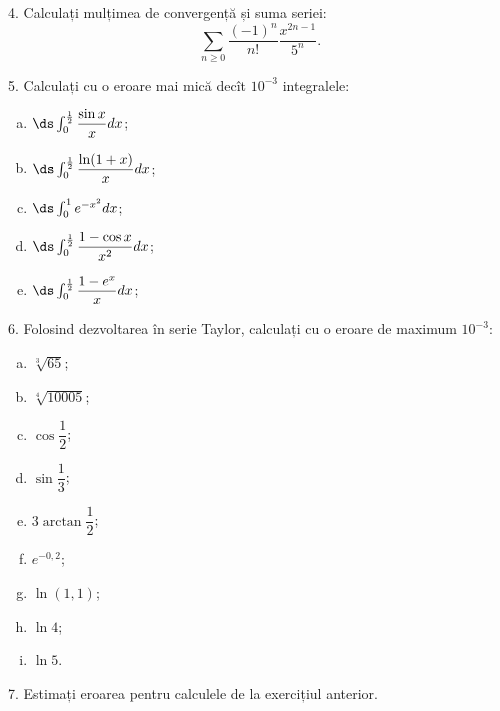 \vspace{0.5cm}

4. Calculați mulțimea de convergență și suma seriei:
\[
    \sum_{n \geq 0} \dfrac{(-1)^n}{n!} \dfrac{x^{2n - 1}}{5^n}.
\]

\vspace{0.5cm}

5. Calculați cu o eroare mai mică decît $ 10^{-3} $ integralele:
\begin{enumerate}[(a)]
    \item $ \ds\int_0^{\frac{1}{2}} \dfrac{\sin x}{x} dx $;
    \item $ \ds\int_0^{\frac{1}{2}} \dfrac{\ln(1 + x)}{x} dx $;
    \item $ \ds\int_0^1 e^{-x^2} dx $;
    \item $ \ds\int_0^{\frac{1}{2}} \dfrac{1 - \cos x}{x^2} dx $;
    \item $ \ds\int_0^{\frac{1}{2}} \dfrac{1 - e^x}{x} dx $;
\end{enumerate}

\vspace{0.5cm}

6. Folosind dezvoltarea în serie Taylor, calculați cu o eroare
de maximum $ 10^{-3} $:
\begin{enumerate}[(a)]
    \item $ \sqrt[3]{65} $;
    \item $ \sqrt[4]{10005} $;
    \item $ \cos \dfrac{1}{2} $;
    \item $ \sin \dfrac{1}{3} $;
    \item $ 3 \arctan \dfrac{1}{2} $;
    \item $ e^{-0,2} $;
    \item $ \ln(1,1) $;
    \item $ \ln 4 $;
    \item $ \ln 5 $.
\end{enumerate}

\vspace{0.5cm}

7. Estimați eroarea pentru calculele de la exercițiul anterior.

\vspace{0.5cm}

